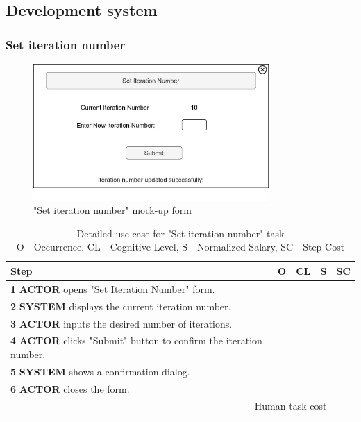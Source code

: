 \subsection{Development system}

\subsubsection{Set iteration number}

\begin{figure}[H]
\centering
\includegraphics[width=0.8\textwidth]{figures/set_iteration_number.png}
\caption{"Set iteration number" mock-up form}
\end{figure}

\begin{table}[H]
\centering
\begin{tabularx}{\textwidth}{|X|c|c|c|c|}
\hline
\textbf{Step} & \textbf{O} & \textbf{CL} & \textbf{S} & \textbf{SC} \\
\hline
\textbf{1} \textbf{ACTOR} opens "Set Iteration Number" form. & & & & \\
\hline
\textbf{2} \textbf{SYSTEM} displays the current iteration number. & & & & \\
\hline
\textbf{3} \textbf{ACTOR} inputs the desired number of iterations. & & & & \\
\hline
\textbf{4} \textbf{ACTOR} clicks "Submit" button to confirm the iteration number. & & & & \\
\hline
\textbf{5} \textbf{SYSTEM} shows a confirmation dialog. & & & & \\
\hline
\textbf{6} \textbf{ACTOR} closes the form. & & & & \\
\hline
\multicolumn{4}{|r|}{Human task cost} & \\
\hline
\end{tabularx}
\caption{Detailed use case for "Set iteration number" task\\ 
O - Occurrence, CL - Cognitive Level, S - Normalized Salary, SC - Step Cost}
\label{table:set_iteration_number}
\end{table}

